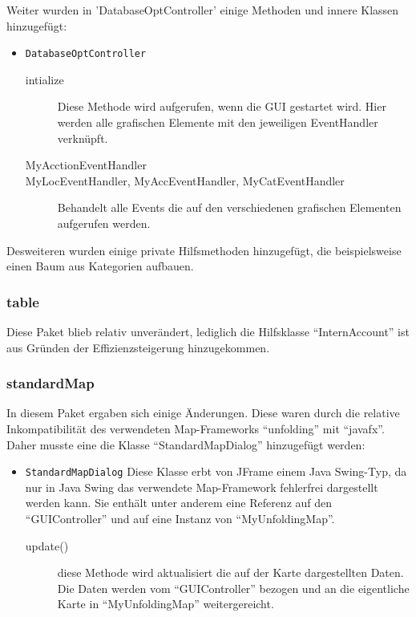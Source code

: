 Weiter wurden in 'DatabaseOptController' einige Methoden und innere Klassen hinzugefügt:
\begin{itemize}
	\item \lstinline{DatabaseOptController}
	\quad
	\begin{description}
		\item[intialize]
		\quad
		Diese Methode wird aufgerufen, wenn die GUI gestartet wird. Hier werden alle grafischen Elemente mit den jeweiligen EventHandler verknüpft.
		\item[MyAcctionEventHandler]
		\item[MyLocEventHandler, MyAccEventHandler, MyCatEventHandler] 
		\quad
		Behandelt alle Events die auf den verschiedenen grafischen Elementen aufgerufen werden.
	\end{description}
\end{itemize}
	
Desweiteren wurden einige private Hilfsmethoden hinzugefügt, die beispielsweise einen Baum aus Kategorien aufbauen.

\subsubsection{table}
Diese Paket blieb relativ unverändert, lediglich die Hilfsklasse "`InternAccount"' ist aus Gründen der Effizienzsteigerung hinzugekommen.
		
\subsubsection{standardMap}
In diesem Paket ergaben sich einige Änderungen. Diese waren durch die relative Inkompatibilität des verwendeten Map-Frameworks "`unfolding"' mit "`javafx"'. Daher musste eine die Klasse "`StandardMapDialog"' hinzugefügt werden:
\begin{itemize}
	\item \lstinline{StandardMapDialog}
	\quad
	Diese Klasse erbt von JFrame einem Java Swing-Typ, da nur in Java Swing das verwendete Map-Framework fehlerfrei dargestellt werden kann. Sie enthält unter anderem eine Referenz auf den "`GUIController"' und auf eine Instanz von "`MyUnfoldingMap"'.
	\begin{description}
		\item[update()] diese Methode wird aktualisiert die auf der Karte dargestellten Daten. Die Daten werden vom "`GUIController"' bezogen und an die eigentliche Karte in "`MyUnfoldingMap"' weitergereicht.
	\end{description}
\end{itemize}
		
